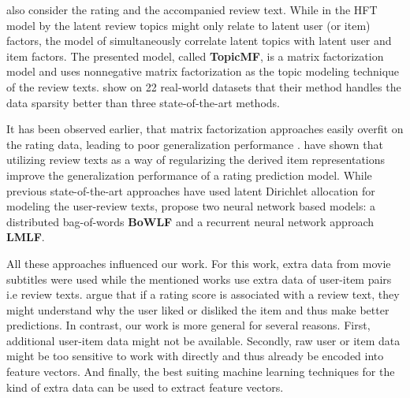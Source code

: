 \cite{Bao2014} also consider the rating and the accompanied review text.
While in the HFT model by \cite{McAuley2013} the latent review topics might only relate to latent user (or item) factors, the model of \cite{Bao2014} simultaneously correlate latent topics with latent user and item factors.
The presented model, called \textbf{TopicMF}, is a matrix factorization model and uses nonnegative matrix factorization as the topic modeling technique of the review texts.
\cite{Bao2014} show on 22 real-world datasets that their method handles the data sparsity better than three state-of-the-art methods.

It has been observed earlier, that matrix factorization approaches easily overfit on the rating data, leading to poor generalization performance \cite{Almahairi2015}.
\cite{Almahairi2015} have shown that utilizing review texts as a way of regularizing the derived item representations improve the generalization performance of a rating prediction model.
While previous state-of-the-art approaches have used latent Dirichlet allocation for modeling the user-review texts, \cite{Almahairi2015} propose two neural network based models: a distributed bag-of-words \textbf{BoWLF} and a recurrent neural network approach \textbf{LMLF}.

All these approaches influenced our work.
For this work, extra data from movie subtitles were used while the mentioned works use extra data of user-item pairs i.e review texts.
\cite{Bao2014} argue that if a rating score is associated with a review text, they might understand why the user liked or disliked the item and thus make better predictions.
In contrast, our work is more general for several reasons.
First, additional user-item data might not be available.
Secondly, raw user or item data might be too sensitive to work with directly and thus already be encoded into feature vectors.
And finally, the best suiting machine learning techniques for the kind of extra data can be used to extract feature vectors.